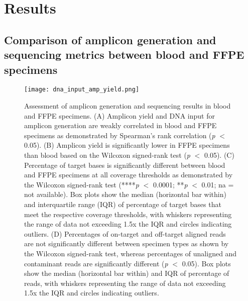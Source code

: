 \documentclass{bmcart}
\begin{document}
\newpage
\section*{Results}
\subsection*{Comparison of amplicon generation and sequencing metrics between blood and FFPE specimens}

\begin{figure}[!htb]
	\texttt{[image: dna\_input\_amp\_yield.png]}
	\caption{Assessment of amplicon generation and sequencing results in blood and FFPE specimens. (A) Amplicon yield and DNA input for amplicon generation are weakly correlated in blood and FFPE specimens as demonstrated by Spearman's rank correlation (\textit{p} $<$ 0.05). (B) Amplicon yield is significantly lower in FFPE specimens than blood based on the Wilcoxon signed-rank test (\textit{p} $<$ 0.05). (C) Percentage of target bases is significantly different between blood and FFPE specimens at all coverage thresholds as demonstrated by the Wilcoxon signed-rank test (****\textit{p} $<$ 0.0001; **\textit{p} $<$ 0.01; na = not available). Box plots show the median (horizontal bar within) and interquartile range (IQR) of percentage of target bases that meet the respective coverage thresholds, with whiskers representing the range of data not exceeding 1.5x the IQR and circles indicating outliers. (D) Percentages of on-target and off-target aligned reads are not significantly different between specimen types as shown by the Wilcoxon signed-rank test, whereas percentages of unaligned and contaminant reads are significantly different (\textit{p} $<$ 0.05). Box plots show the median (horizontal bar within) and IQR of percentage of reads, with whiskers representing the range of data not exceeding 1.5x the IQR and circles indicating outliers.}
	\label{fig:dna_input_amp_yield}
\end{figure}
\FloatBarrier
\end{document}
